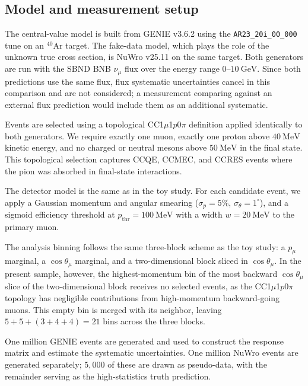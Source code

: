\documentclass[a4paper,11pt]{article}
\begin{document}
\subsection{Model and measurement setup}
\label{subsec:real_setup}

The central-value model is built from GENIE v3.6.2 \cite{Andreopoulos:2009rq} using the \texttt{AR23\_20i\_00\_000} tune on an $^{40}\mathrm{Ar}$ target. The fake-data model, which plays the role of the unknown true cross section, is NuWro v25.11 \cite{Golan:2012rfa} on the same target. Both generators are run with the SBND BNB $\nu_\mu$ flux over the energy range $0$--$10 ~ \mathrm{GeV}$. Since both predictions use the same flux, flux systematic uncertainties cancel in this comparison and are not considered; a measurement comparing against an external flux prediction would include them as an additional systematic.

Events are selected using a topological CC1$\mu$1$p$0$\pi$ definition applied identically to both generators. We require exactly one muon, exactly one proton above $40~\mathrm{MeV}$ kinetic energy, and no charged or neutral mesons above $50~\mathrm{MeV}$ in the final state. This topological selection captures CCQE, CCMEC, and CCRES events where the pion was absorbed in final-state interactions.

The detector model is the same as in the toy study. For each candidate event, we apply a Gaussian momentum and angular smearing ($\sigma_p = 5\%$, $\sigma_\theta = 1^\circ$), and a sigmoid efficiency threshold at $p_\text{thr} = 100~\mathrm{MeV}$ with a width $w = 20~\mathrm{MeV}$ to the primary muon.

The analysis binning follows the same three-block scheme as the toy study: a $p_\mu$ marginal, a $\cos\theta_\mu$ marginal, and a two-dimensional block sliced in $\cos\theta_\mu$. In the present sample, however, the highest-momentum bin of the most backward $\cos\theta_\mu$ slice of the two-dimensional block receives no selected events, as the CC1$\mu$1$p$0$\pi$ topology has negligible contributions from high-momentum backward-going muons. This empty bin is merged with its neighbor, leaving $5+5+(3+4+4)=21$ bins across the three blocks.

One million GENIE events are generated and used to construct the response matrix and estimate the systematic uncertainties. One million NuWro events are generated separately; $5{,}000$ of these are drawn as pseudo-data, with the remainder serving as the high-statistics truth prediction.
\end{document}
